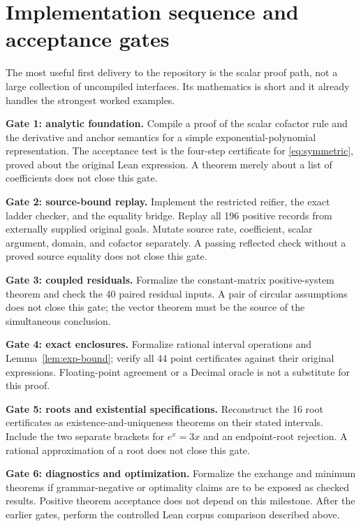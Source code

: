 \section{Implementation sequence and acceptance gates}
\label{sec:gates}

The most useful first delivery to the repository is the scalar proof path, not a large collection of uncompiled interfaces. Its mathematics is short and it already handles the strongest worked examples.

\textbf{Gate 1: analytic foundation.} Compile a proof of the scalar cofactor rule and the derivative and anchor semantics for a simple exponential-polynomial representation. The acceptance test is the four-step certificate for \eqref{eq:symmetric}, proved about the original Lean expression. A theorem merely about a list of coefficients does not close this gate.

\textbf{Gate 2: source-bound replay.} Implement the restricted reifier, the exact ladder checker, and the equality bridge. Replay all 196 positive records from externally supplied original goals. Mutate source rate, coefficient, scalar argument, domain, and cofactor separately. A passing reflected check without a proved source equality does not close this gate.

\textbf{Gate 3: coupled residuals.} Formalize the constant-matrix positive-system theorem and check the 40 paired residual inputs. A pair of circular assumptions does not close this gate; the vector theorem must be the source of the simultaneous conclusion.

\textbf{Gate 4: exact enclosures.} Formalize rational interval operations and Lemma~\ref{lem:exp-bound}; verify all 44 point certificates against their original expressions. Floating-point agreement or a Decimal oracle is not a substitute for this proof.

\textbf{Gate 5: roots and existential specifications.} Reconstruct the 16 root certificates as existence-and-uniqueness theorems on their stated intervals. Include the two separate brackets for $e^x=3x$ and an endpoint-root rejection. A rational approximation of a root does not close this gate.

\textbf{Gate 6: diagnostics and optimization.} Formalize the exchange and minimum theorems if grammar-negative or optimality claims are to be exposed as checked results. Positive theorem acceptance does not depend on this milestone. After the earlier gates, perform the controlled Lean corpus comparison described above.

